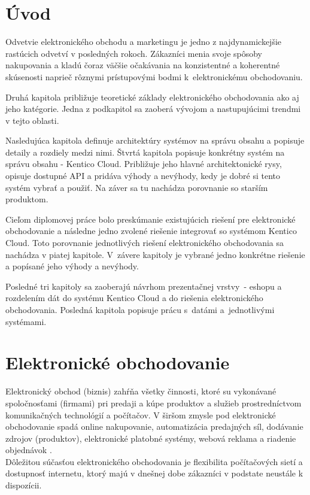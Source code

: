 \documentclass[
  printed, %
  table,   %
  lof,     %
  nolot,     %
  twoside,  
]{fithesis3}
\begin{document}
\chapter{Úvod}
 Odvetvie elektronického obchodu a marketingu je jedno z najdynamickejšie rastúcich odvetví v posledných rokoch. Zákazníci menia svoje spôsoby nakupovania a kladú čoraz väčšie očakávania na konzistentné a koherentné skúsenosti naprieč rôznymi prístupovými bodmi k~elektronickému obchodovaniu.
 
 Druhá kapitola približuje teoretické základy elektronického obchodovania ako aj jeho katégorie. Jedna z podkapitol sa zaoberá vývojom a nastupujúcimi trendmi v tejto oblasti.
 
 Nasledujúca kapitola definuje architektúry systémov na správu obsahu a popisuje detaily a rozdiely medzi nimi. Štvrtá kapitola popisuje konkrétny systém na správu obsahu - Kentico Cloud. Približuje jeho hlavné architektonické rysy, opisuje dostupné API a pridáva výhody a nevýhody,  kedy je dobré si tento systém vybrať a použiť. Na záver sa tu nachádza porovnanie so starším produktom.
 
 Cieľom diplomovej práce bolo preskúmanie existujúcich riešení pre elektronické obchodovanie a následne jedno zvolené riešenie integrovať so systémom Kentico Cloud. Toto porovnanie jednotlivých riešení elektronického obchodovania sa nachádza v piatej kapitole. V~závere kapitoly je vybrané jedno konkrétne riešenie a popísané jeho výhody a nevýhody. 
 
 Posledné tri kapitoly sa zaoberajú návrhom prezentačnej vrstvy~- eshopu a rozdelením dát do systému Kentico Cloud a do riešenia elektronického obchodovania. Posledná kapitola popisuje prácu s~datámi a~jednotlivými systémami.



\chapter{Elektronické obchodovanie}
Elektronický obchod (biznis) zahŕňa všetky činnosti, ktoré su vykonávané spoločnosťami (firmami) pri predaji a kúpe produktov a služieb prostredníctvom komunikačných technológií a počítačov. V širšom zmysle pod elektronické obchodovanie spadá online nakupovanie, automatizácia predajných síl, dodávanie zdrojov (produktov), elektronické platobné systémy, webová reklama a riadenie objednávok \cite{ec1}. \\
Dôležitou súčasťou elektronického obchodovania je flexibilita počítačových sietí a dostupnosť internetu, ktorý majú v dnešnej dobe zákazníci v podstate neustále k dispozícii.
\end{document}
